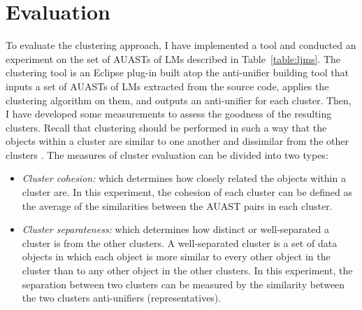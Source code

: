 \section{Evaluation} \label{clustering-evaluation}
To evaluate the clustering approach, I have implemented a tool and conducted an experiment on the set of AUASTs of LMs described in Table~\ref{table:ljms}. The clustering tool is an Eclipse plug-in built atop the anti-unifier building tool that inputs a set of AUASTs of LMs extracted from the source code, applies the clustering algorithm on them, and outputs an anti-unifier for each cluster. Then, I have developed some measurements to assess the goodness of the resulting clusters. Recall that clustering should be performed in such a way that the objects within a cluster are similar to one another and dissimilar from the other clusters \cite{tan2005data}. The measures of cluster evaluation can be divided into two types:

\begin{itemize} [leftmargin=0.4in]
\item \emph{Cluster cohesion:} which determines how closely related the objects within a cluster are. In this experiment, the cohesion of each cluster can be defined as the average of the similarities between the AUAST pairs in each cluster.
\item \emph{Cluster separateness:} which determines how distinct or well-separated a cluster is from the other clusters. A well-separated cluster is a set of data objects in which each object is more similar to every other object in the cluster than to any other object in the other clusters.  In this experiment, the separation between two clusters can be measured by the similarity between the two clusters anti-unifiers (representatives). 
\end{itemize}


